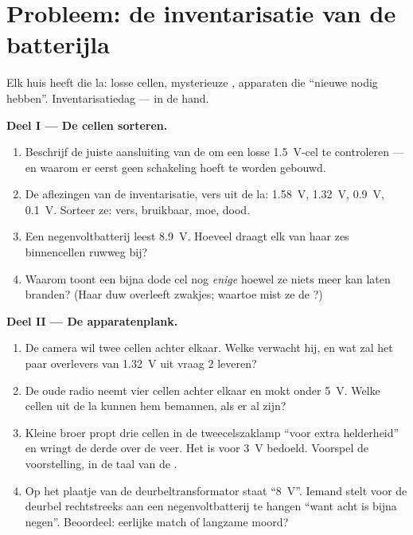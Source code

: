 \section{Probleem: de inventarisatie van de batterijla}

\begin{problem}\label{pb:g8:voltage-voltmeter:1}
Elk huis heeft die la: losse cellen, mysterieuze , apparaten
die ``nieuwe nodig hebben''. Inventarisatiedag ---
 in de hand.

\medskip\noindent\textbf{Deel I --- De cellen sorteren.}
\begin{enumerate}
  \item Beschrijf de juiste aansluiting van de
         om een losse \qty{1.5}{V}-cel te
        controleren --- en waarom er eerst geen schakeling hoeft te
        worden gebouwd.
  \item De aflezingen van de inventarisatie, vers uit de la:
        \qty{1.58}{V}, \qty{1.32}{V}, \qty{0.9}{V}, \qty{0.1}{V}.
        Sorteer ze: vers, bruikbaar, moe, dood.
  \item Een negenvoltbatterij leest \qty{8.9}{V}. Hoeveel
        draagt elk van haar zes binnencellen ruwweg bij?
  \item Waarom toont een bijna dode cel nog \emph{enige}
         hoewel ze niets meer kan laten
        branden? (Haar duw overleeft zwakjes; waartoe mist ze
        de ?)
\end{enumerate}

\medskip\noindent\textbf{Deel II --- De apparatenplank.}
\begin{enumerate}[resume]
  \item De camera wil twee cellen achter elkaar. Welke
         verwacht hij, en wat zal het paar overlevers van
        \qty{1.32}{V} uit vraag 2 leveren?
  \item De oude radio neemt vier cellen achter elkaar en mokt onder
        \qty{5}{V}. Welke cellen uit de la kunnen hem bemannen, als
        er al zijn?
  \item Kleine broer propt drie cellen in de tweecelszaklamp ``voor
        extra helderheid'' en wringt de derde over de veer. Het
         is voor \qty{3}{V} bedoeld. Voorspel de
        voorstelling, in de taal van de
        .
  \item Op het plaatje van de deurbeltransformator staat
        ``\qty{8}{V}''. Iemand stelt voor de deurbel rechtstreeks aan
        een negenvoltbatterij te hangen ``want acht is
        bijna negen''. Beoordeel: eerlijke match of langzame moord?
\end{enumerate}


\end{problem}
